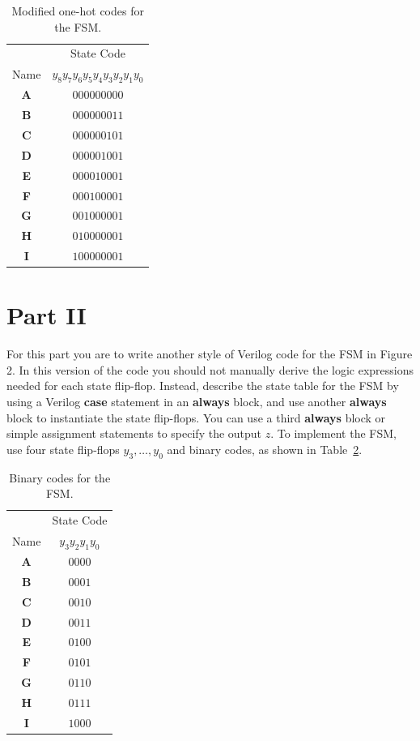 \documentclass[epsfig,10pt,fullpage]{article}
\begin{document}
\begin{enumerate}
\begin{table}[H]
\begin{center}
\begin{tabular}{c|c}
~ & State Code \\ 
Name & $y_8 y_7 y_6 y_5 y_4 y_3 y_2 y_1 y_0$ \\ \hline
\rule[-0.075in]{0in}{0.25in}{\bf A} & $000000000$ \\ 
{\bf B} & $000000011$ \\ 
{\bf C} & $000000101$ \\ 
{\bf D} & $000001001$ \\ 
{\bf E} & $000010001$ \\ 
{\bf F} & $000100001$ \\ 
{\bf G} & $001000001$ \\ 
{\bf H} & $010000001$ \\ 
{\bf I} & $100000001$ \\
\end{tabular}
\end{center}
\caption{Modified one-hot codes for the FSM.}
\label{tab:modified_state_assignment}
\end{table}

\end{enumerate}

\section*{Part II}
For this part you are to write another style of Verilog code for the FSM in Figure 2. In
this version of the code you should not manually derive the logic expressions needed for
each state flip-flop. Instead, describe the state table for the FSM by using a
Verilog {\bf case} statement in an {\bf always} block, and use another {\bf always} block to
instantiate the state flip-flops. You can use a third {\bf always} block or simple assignment
statements to specify the output $z$. To implement the FSM, use four state flip-flops
$y_3, \ldots, y_0$ and binary codes, as shown in Table~\ref{tab:bincodes}.

\begin{table}[H]
\begin{center}
\begin{tabular}{c|c}
~ & State Code \\ 
Name & $y_3 y_2 y_1 y_0$ \\ \hline
\rule[-0.075in]{0in}{0.25in}{\bf A} & $0000$ \\ 
{\bf B} & $0001$ \\ 
{\bf C} & $0010$ \\ 
{\bf D} & $0011$ \\ 
{\bf E} & $0100$ \\ 
{\bf F} & $0101$ \\ 
{\bf G} & $0110$ \\ 
{\bf H} & $0111$ \\ 
{\bf I} & $1000$ \\ 
\end{tabular}
\end{center}
\caption{Binary codes for the FSM.}
\label{tab:bincodes}
\end{table}
\end{document}
